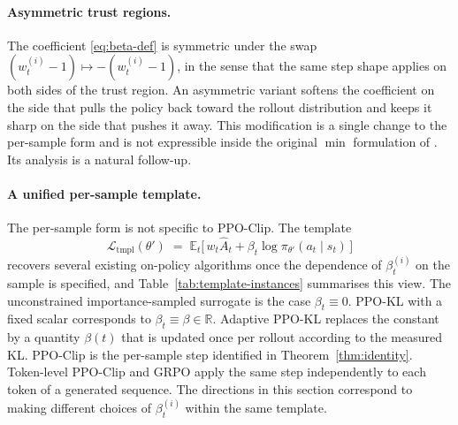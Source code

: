 \documentclass{article}
\begin{document}
\paragraph{Asymmetric trust regions.}
The coefficient \eqref{eq:beta-def} is symmetric under the swap
$(w_t^{(i)} - 1) \mapsto -(w_t^{(i)} - 1)$, in the sense that the
same step shape applies on both sides of the trust region. An
asymmetric variant softens the coefficient on the side that pulls
the policy back toward the rollout distribution and keeps it sharp
on the side that pushes it away. This modification is a single
change to the per-sample form and is not expressible inside the
original $\min$ formulation of \citet{schulman2017ppo}. Its analysis
is a natural follow-up.

\paragraph{A unified per-sample template.}
The per-sample form is not specific to PPO-Clip. The template
\begin{equation}
\mathcal{L}_{\mathrm{tmpl}}(\theta')
\;=\;
\mathbb{E}_t\!\bigl[\,w_t \hat{A}_t + \beta_t \log\pi_{\theta'}(a_t \mid s_t)\,\bigr]
\label{eq:template}
\end{equation}
recovers several existing on-policy algorithms once the dependence of
$\beta_t^{(i)}$ on the sample is specified, and Table~\ref{tab:template-instances}
summarises this view. The unconstrained importance-sampled surrogate
is the case $\beta_t \equiv 0$. PPO-KL with a fixed scalar
\citep{schulman2017ppo} corresponds to $\beta_t \equiv \beta \in
\mathbb{R}$. Adaptive PPO-KL \citep{schulman2017ppo} replaces the
constant by a quantity $\beta(t)$ that is updated once per rollout
according to the measured KL. PPO-Clip is the per-sample step
identified in Theorem~\ref{thm:identity}. Token-level PPO-Clip and
GRPO \citep{shao2024deepseekmath, deepseekai2025r1} apply the same
step independently to each token of a generated sequence. The
directions in this section correspond to making different choices of
$\beta_t^{(i)}$ within the same template.
\end{document}
